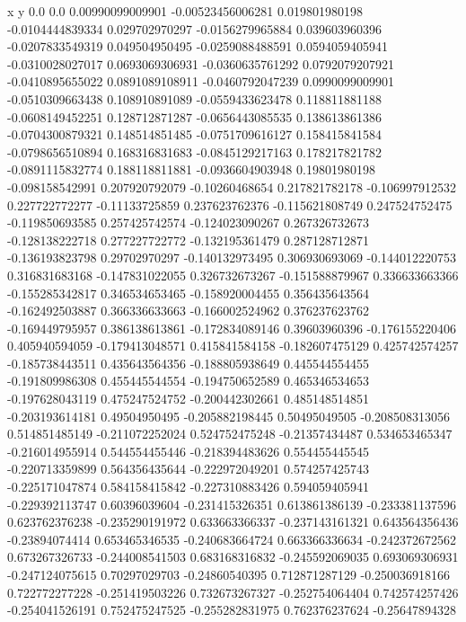               x                y
            0.0              0.0
0.00990099009901  -0.00523456006281
 0.019801980198  -0.0104444839334
 0.029702970297  -0.0156279965884
 0.039603960396  -0.0207833549319
 0.049504950495  -0.0259088488591
0.0594059405941  -0.0310028027017
0.0693069306931  -0.0360635761292
0.0792079207921  -0.0410895655022
0.0891089108911  -0.0460792047239
0.0990099009901  -0.0510309663438
 0.108910891089  -0.0559433623478
 0.118811881188  -0.0608149452251
 0.128712871287  -0.0656443085535
 0.138613861386  -0.0704300879321
 0.148514851485  -0.0751709616127
 0.158415841584  -0.0798656510894
 0.168316831683  -0.0845129217163
 0.178217821782  -0.0891115832774
 0.188118811881  -0.0936604903948
  0.19801980198  -0.098158542991
 0.207920792079   -0.10260468654
 0.217821782178  -0.106997912532
 0.227722772277   -0.11133725859
 0.237623762376  -0.115621808749
 0.247524752475  -0.119850693585
 0.257425742574  -0.124023090267
 0.267326732673  -0.128138222718
 0.277227722772  -0.132195361479
 0.287128712871  -0.136193823798
  0.29702970297  -0.140132973495
 0.306930693069  -0.144012220753
 0.316831683168  -0.147831022055
 0.326732673267  -0.151588879967
 0.336633663366  -0.155285342817
 0.346534653465  -0.158920004455
 0.356435643564  -0.162492503887
 0.366336633663  -0.166002524962
 0.376237623762  -0.169449795957
 0.386138613861  -0.172834089146
  0.39603960396  -0.176155220406
 0.405940594059  -0.179413048571
 0.415841584158  -0.182607475129
 0.425742574257  -0.185738443511
 0.435643564356  -0.188805938649
 0.445544554455  -0.191809986308
 0.455445544554  -0.194750652589
 0.465346534653  -0.197628043119
 0.475247524752  -0.200442302661
 0.485148514851  -0.203193614181
  0.49504950495  -0.205882198445
  0.50495049505  -0.208508313056
 0.514851485149  -0.211072252024
 0.524752475248   -0.21357434487
 0.534653465347  -0.216014955914
 0.544554455446  -0.218394483626
 0.554455445545  -0.220713359899
 0.564356435644  -0.222972049201
 0.574257425743  -0.225171047874
 0.584158415842  -0.227310883426
 0.594059405941  -0.229392113747
  0.60396039604  -0.231415326351
 0.613861386139  -0.233381137596
 0.623762376238  -0.235290191972
 0.633663366337  -0.237143161321
 0.643564356436   -0.23894074414
 0.653465346535  -0.240683664724
 0.663366336634  -0.242372672562
 0.673267326733  -0.244008541503
 0.683168316832  -0.245592069035
 0.693069306931  -0.247124075615
  0.70297029703   -0.24860540395
 0.712871287129  -0.250036918166
 0.722772277228  -0.251419503226
 0.732673267327  -0.252754064404
 0.742574257426  -0.254041526191
 0.752475247525  -0.255282831975
 0.762376237624   -0.25647894328
